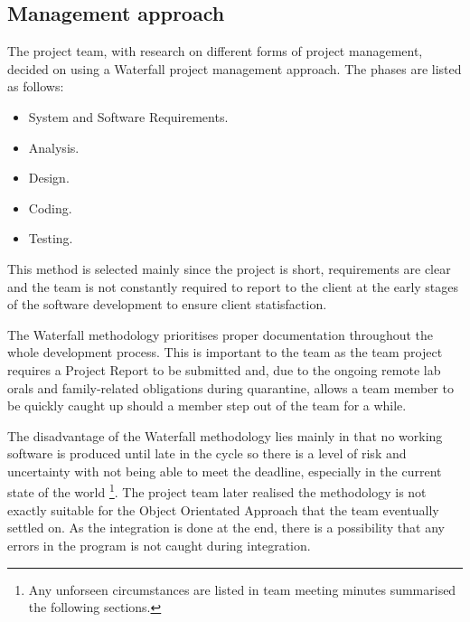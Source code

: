 \documentclass[12pt,a4paper]{article}
\begin{document}
	\pagebreak

	\subsection{Management approach}
	The project team, with research on different forms of project management, decided on using a Waterfall project
	management approach. The phases are listed as follows: \par
	\begin{itemize}
		\item System and Software Requirements.
		\item Analysis.
		\item Design.
		\item Coding.
		\item Testing.
	\end{itemize}
	This method is selected mainly since the project is short, requirements are clear and the team 
	is not constantly required to report to the client at the early stages of the software development to ensure 
	client statisfaction. \par

	The Waterfall methodology prioritises proper documentation throughout the whole development process. This is important
	to the team as the team project requires a Project Report to be submitted and, due to the ongoing remote lab orals and 
	family-related obligations during quarantine, allows a team member to be quickly caught up should a member step out
	of the team for a while.  

	The disadvantage of the Waterfall methodology lies mainly in that no working software is produced until late in the 
	cycle so there is a level of risk and uncertainty with not being able to meet the deadline, especially in the 
	current state of the world \footnote{Any unforseen circumstances are listed in team meeting minutes summarised the following sections.}. 
	The project team later realised the methodology is not exactly suitable for the Object Orientated Approach 
	that the team eventually settled on. As the integration is done at the end, there is a possibility that any errors
	in the program is not caught during integration.

	\vfill
	\pagebreak
\end{document}
